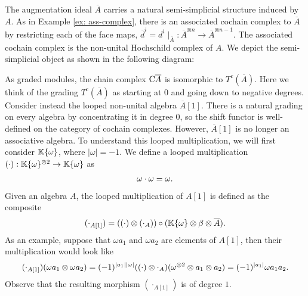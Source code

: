 \documentclass[../thesis.tex]{subfiles}
\begin{document}
            The augmentation ideal $\overline{A}$ carries a natural semi-simplicial structure induced by $A$. As in Example \ref{ex: ass-complex}, there is an associated cochain complex to $\overline{A}$ by restricting each of the face maps, ${\overline{d}}^i = d^i {\mid}_{\overline{A}}:\overline{A}^{\otimes n} \rightarrow \overline{A}^{\otimes n-1}$. The associated cochain complex is the non-unital Hochschild complex of $A$. We depict the semi-simplicial object as shown in the following diagram:
            \begin{center}
            \end{center}

            As graded modules, the chain complex $\tt{C}\overline{A}$ is isomorphic to $T^c(\overline{A})$. Here we think of the grading $T^c(\overline{A})$ as starting at $0$ and going down to negative degrees. Consider instead the looped non-unital algebra $\overline{A}[1]$. There is a natural grading on every algebra by concentrating it in degree $0$, so the shift functor is well-defined on the category of cochain complexes. However, $\overline{A}[1]$ is no longer an associative algebra. To understand this looped multiplication, we will first consider $\mathbb{K}\startset{\omega}$, where $|\omega| = -1$. We define a looped multiplication $(\cdot):\mathbb{K}\startset{\omega}^{\otimes 2} \rightarrow \mathbb{K}\startset{\omega}$ as
            \begin{align*}
                \omega \cdot \omega = \omega\tt{.}
            \end{align*}
            Given an algebra $A$, the looped multiplication of $A[1]$ is defined as the composite 
            \begin{align*}
                (\cdot_{A[1]}) = ((\cdot) \otimes (\cdot_A)) \circ (\mathbb{K}\startset{\omega} \otimes \beta \otimes \overline{A})\tt{.} 
            \end{align*}
            As an example, suppose that $\omega a_1$ and $\omega a_2$ are elements of $A[1]$, then their multiplication would look like
            \begin{align*}
                (\cdot_{A[1]})(\omega a_1 \otimes \omega a_2) = (-1)^{|a_1||\omega|}((\cdot) \otimes \cdot_{A})(\omega^{\otimes 2} \otimes a_1 \otimes a_2) = (-1)^{|a_1|}\omega a_1 a_2\tt{.}
            \end{align*}
            Observe that the resulting morphism $(\cdot_{A[1]})$ is of degree $1$.
\end{document}
